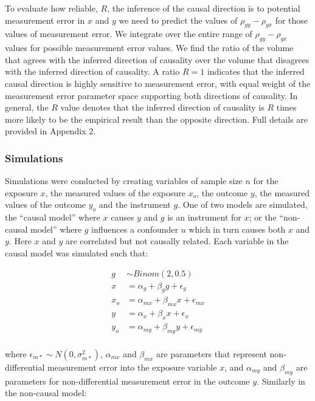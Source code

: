 \documentclass[]{article}
\begin{document}
To evaluate how reliable, \(R\), the inference of the causal direction
is to potential measurement error in \(x\) and \(y\) we need to predict
the values of \(\rho_{gy} - \rho_{gx}\) for those values of measurement
error. We integrate over the entire range of \(\rho_{gy} - \rho_{gx}\)
values for possible measurement error values. We find the ratio of the
volume that agrees with the inferred direction of causality over the
volume that disagrees with the inferred direction of causality. A ratio
\(R=1\) indicates that the inferred causal direction is highly sensitive
to measurement error, with equal weight of the measurement error
parameter space supporting both directions of causality. In general, the
\(R\) value denotes that the inferred direction of causality is \(R\)
times more likely to be the empirical result than the opposite
direction. Full details are provided in Appendix 2.

\subsubsection{Simulations}\label{simulations}

Simulations were conducted by creating variables of sample size \(n\)
for the exposure \(x\), the measured values of the exposure \(x_o\), the
outcome \(y\), the measured values of the outcome \(y_o\) and the
instrument \(g\). One of two models are simulated, the ``causal model''
where \(x\) causes \(y\) and \(g\) is an instrument for \(x\); or the
``non-causal model'' where \(g\) influences a confounder \(u\) which in
turn causes both \(x\) and \(y\). Here \(x\) and \(y\) are correlated
but not causally related. Each variable in the causal model was
simulated such that:

\[
\begin{aligned}
g & \sim Binom(2, 0.5) \\
x & = \alpha_g + \beta_g g + \epsilon_g \\
x_o & = \alpha_{mx} + \beta_{mx} x + \epsilon_{mx} \\
y & = \alpha_x + \beta_x x + \epsilon_x \\
y_o & = \alpha_{my} + \beta_{my} y + \epsilon_{my} \\
\end{aligned}
\]

where \(\epsilon_{m*} \sim N(0, \sigma^2_{m*})\), \(\alpha_{mx}\) and
\(\beta_{mx}\) are parameters that represent non-differential
measurement error into the exposure variable \(x\), and \(\alpha_{my}\)
and \(\beta_{my}\) are parameters for non-differential measurement error
in the outcome \(y\). Similarly in the non-causal model:
\end{document}
